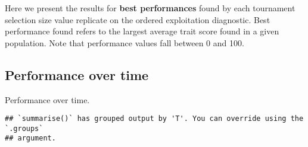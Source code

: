 \documentclass[]{book}
\newenvironment{Shaded}{\begin{snugshade}}{\end{snugshade}}
\newcommand{\DataTypeTok}[1]{\textcolor[rgb]{0.13,0.29,0.53}{#1}}
\newcommand{\KeywordTok}[1]{\textcolor[rgb]{0.13,0.29,0.53}{\textbf{#1}}}
\newcommand{\NormalTok}[1]{#1}
\newcommand{\OperatorTok}[1]{\textcolor[rgb]{0.81,0.36,0.00}{\textbf{#1}}}
\newcommand{\StringTok}[1]{\textcolor[rgb]{0.31,0.60,0.02}{#1}}
\begin{document}
Here we present the results for \textbf{best performances} found by each tournament selection size value replicate on the ordered exploitation diagnostic.
Best performance found refers to the largest average trait score found in a given population.
Note that performance values fall between 0 and 100.

\hypertarget{performance-over-time-7}{%
\subsection{Performance over time}\label{performance-over-time-7}}

Performance over time.

\begin{Shaded}
\end{Shaded}

\begin{verbatim}
## `summarise()` has grouped output by 'T'. You can override using the `.groups`
## argument.
\end{verbatim}
\end{document}
